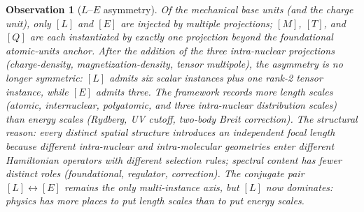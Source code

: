 \documentclass[11pt]{article}
\newtheorem{observation}{Observation}
\begin{document}
\begin{observation}[$L$--$E$ asymmetry]
\label{obs:LE_asymmetry}
Of the mechanical base units (and the charge unit), only $[L]$ and
$[E]$ are injected by multiple projections; $[M]$, $[T]$, and $[Q]$
are each instantiated by exactly one projection beyond the
foundational atomic-units anchor.  After the addition of the three
intra-nuclear projections (charge-density, magnetization-density,
tensor multipole), the asymmetry is no longer symmetric: $[L]$
admits \emph{six} scalar instances plus one rank-2 tensor instance,
while $[E]$ admits three.  The framework records more length scales
(atomic, internuclear, polyatomic, and three intra-nuclear
distribution scales) than energy scales (Rydberg, UV cutoff,
two-body Breit correction).  The structural
reason: every distinct spatial structure introduces an independent
focal length because different intra-nuclear and intra-molecular
geometries enter different Hamiltonian operators with different
selection rules; spectral content has fewer distinct roles
(foundational, regulator, correction).  The conjugate
pair $[L] \leftrightarrow [E]$ remains the only multi-instance
axis, but $[L]$ now dominates: physics has more places to put
length scales than to put energy scales.
\end{observation}
\end{document}
